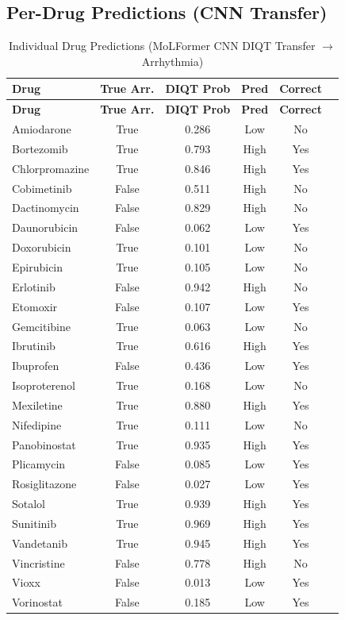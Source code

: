 \documentclass[11pt]{article}
\begin{document}
\subsection{Per-Drug Predictions (CNN Transfer)}

\begin{longtable}{lccccc}
\caption{Individual Drug Predictions (MoLFormer CNN DIQT Transfer $\rightarrow$ Arrhythmia)} \\
\toprule
\textbf{Drug} & \textbf{True Arr.} & \textbf{DIQT Prob} & \textbf{Pred} & \textbf{Correct} \\
\midrule
\endfirsthead
\toprule
\textbf{Drug} & \textbf{True Arr.} & \textbf{DIQT Prob} & \textbf{Pred} & \textbf{Correct} \\
\midrule
\endhead
Amiodarone & True & 0.286 & Low & No \\
Bortezomib & True & 0.793 & High & Yes \\
Chlorpromazine & True & 0.846 & High & Yes \\
Cobimetinib & False & 0.511 & High & No \\
Dactinomycin & False & 0.829 & High & No \\
Daunorubicin & False & 0.062 & Low & Yes \\
Doxorubicin & True & 0.101 & Low & No \\
Epirubicin & True & 0.105 & Low & No \\
Erlotinib & False & 0.942 & High & No \\
Etomoxir & False & 0.107 & Low & Yes \\
Gemcitibine & True & 0.063 & Low & No \\
Ibrutinib & True & 0.616 & High & Yes \\
Ibuprofen & False & 0.436 & Low & Yes \\
Isoproterenol & True & 0.168 & Low & No \\
Mexiletine & True & 0.880 & High & Yes \\
Nifedipine & True & 0.111 & Low & No \\
Panobinostat & True & 0.935 & High & Yes \\
Plicamycin & False & 0.085 & Low & Yes \\
Rosiglitazone & False & 0.027 & Low & Yes \\
Sotalol & True & 0.939 & High & Yes \\
Sunitinib & True & 0.969 & High & Yes \\
Vandetanib & True & 0.945 & High & Yes \\
Vincristine & False & 0.778 & High & No \\
Vioxx & False & 0.013 & Low & Yes \\
Vorinostat & False & 0.185 & Low & Yes \\
\bottomrule
\end{longtable}
\end{document}
